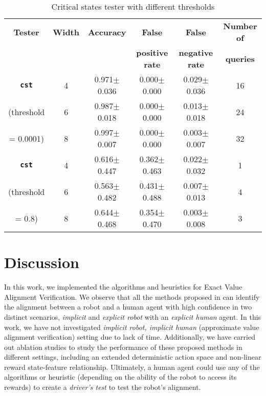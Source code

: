 \vspace{-3mm}
\begin{table}[!hbtp]
    
  \caption{Critical states tester with different thresholds}
  \label{tab:cst_thresholds}
  \centering
  \begin{tabular}{cccccc}
    \toprule
    \textbf{Tester} & \textbf{Width} & \textbf{Accuracy} & \textbf{False} & \textbf{False} & \textbf{Number of} \\
    & & & \textbf{positive rate} & \textbf{negative rate} & \textbf{queries} \\
    \midrule
    \textbf{\texttt{cst}} & 4 & 0.971$\pm$	0.036&	0.000$\pm$0.000&	0.029$\pm$0.036&	16\\
    (threshold & 6 & 0.987$\pm$0.018&	0.000$\pm$0.000&	0.013$\pm$0.018&	24\\
    = 0.0001) & 8 & 0.997$\pm$	0.007&	0.000$\pm$0.000&	0.003$\pm$0.007&	32\\
    \midrule
    \textbf{\texttt{cst}} & 4 & 0.616$\pm$	0.447&	0.362$\pm$0.463&	0.022$\pm$0.032&	1\\
    (threshold & 6 & 0.563$\pm$0.482&	0.431$\pm$0.488&	0.007$\pm$0.013&	4\\
    = 0.8) & 8 & 0.644$\pm$0.468&	0.354$\pm$0.470&	0.003$\pm$0.008&	3\\

\bottomrule
    \end{tabular}
\end{table}
\vspace{-1mm}

\section{Discussion}
\label{sec:discussion}
In this work, we implemented the algorithms and heuristics for Exact Value Alignment Verification. We observe that all the methods proposed in \cite{brown2021value} can identify the alignment between a robot and a human agent with high confidence in two distinct scenarios, \textit{implicit} and \textit{explicit robot} with an \textit{explicit human} agent. In this work, we have not investigated \textit{implicit robot, implicit human} (approximate value alignment verification) setting due to lack of time. Additionally, we have carried out ablation studies to study the performance of these proposed methods in different settings, including an extended deterministic action space and non-linear reward state-feature relationship. Ultimately, a human agent could use any of the algorithms or heuristic (depending on the ability of the robot to access its rewards) to create a \textit{driver's test} to test the robot's alignment.